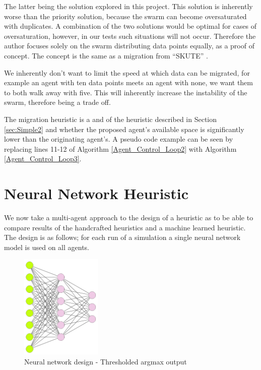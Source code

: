 \documentclass{UoYCSproject}
\begin{document}
The latter being the solution explored in this project. 
This solution is inherently worse than the priority solution, because the swarm can become oversaturated with duplicates. 
A combination of the two solutions would be optimal for cases of oversaturation, however, in our tests such situations will not occur. 
Therefore the author focuses solely on the swarm distributing data points equally, as a proof of concept. 
The concept is the same as a migration from “SKUTE” \cite{Distributed Storage}.

We inherently don’t want to limit the speed at which data can be migrated, for example an agent with ten data points meets an agent with none, we want them to both walk away with five. 
This will inherently increase the instability of the swarm, therefore being a trade off.

The migration heuristic is a and of the heuristic described in Section \ref{sec:Simple2} and whether the proposed agent's available space is significantly lower than the originating agent’s. 
A pseudo code example can be seen by replacing lines 11-12 of Algorithm \ref{Agent_Control_Loop2} with Algorithm \ref{Agent_Control_Loop3}.


\section{Neural Network Heuristic}
\label{sec:Simple5}

We now take a multi-agent approach to the design of a heuristic as to be able to compare results of the handcrafted heuristics and a machine learned heuristic. The design is as follows; for each run of a simulation a single neural network model is used on all agents.

\begin{figure}[htb]
\label{fig:Neural network}
\begin{center}
\centering
\includegraphics[height=5cm]{"./ExplanationImgs/NN.png"}
\caption{Neural network design - Thresholded argmax output}
\end{center}
\end{figure}
\end{document}

